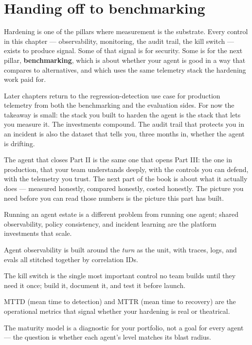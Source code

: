\section{Handing off to benchmarking}

Hardening is one of the pillars where measurement is the substrate. Every control in this chapter --- observability, monitoring, the audit trail, the kill switch --- exists to produce signal. Some of that signal is for security. Some is for the next pillar, \textbf{benchmarking}, which is about whether your agent is good in a way that compares to alternatives, and which uses the same telemetry stack the hardening work paid for.

Later chapters return to the regression-detection use case for production telemetry from both the benchmarking and the evaluation sides. For now the takeaway is small: the stack you built to harden the agent is the stack that lets you measure it. The investments compound. The audit trail that protects you in an incident is also the dataset that tells you, three months in, whether the agent is drifting.

The agent that closes Part II is the same one that opens Part III: the one in production, that your team understands deeply, with the controls you can defend, with the telemetry you trust. The next part of the book is about what it actually does --- measured honestly, compared honestly, costed honestly. The picture you need before you can read those numbers is the picture this part has built.

\TNrule

\stoptwocol

\begin{TNkeytakeaways}
\item Running an agent estate is a different problem from running one agent; shared observability, policy consistency, and incident learning are the platform investments that scale.
\item Agent observability is built around the \textit{turn} as the unit, with traces, logs, and evals all stitched together by correlation IDs.
\item The kill switch is the single most important control no team builds until they need it once; build it, document it, and test it before launch.
\item MTTD (mean time to detection) and MTTR (mean time to recovery) are the operational metrics that signal whether your hardening is real or theatrical.
\item The maturity model is a diagnostic for your portfolio, not a goal for every agent --- the question is whether each agent's level matches its blast radius.
\end{TNkeytakeaways}

